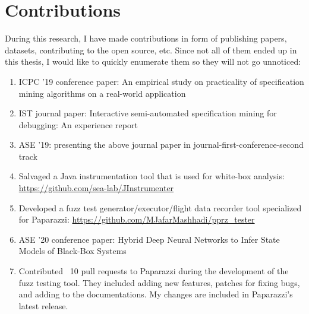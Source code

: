 \dedication{To the ones who made this a smoother journey.} 


\tableofcontents


\listoftables


\listoffigures


\chapter{Contributions}
During this research, I have made contributions in form of publishing papers, datasets, contributing to the open source, etc. 
Since not all of them ended up in this thesis, I would like to quickly enumerate them so they will not go unnoticed:
\begin{enumerate}
    \item ICPC '19 conference paper: An empirical study on practicality of specification mining algorithms on a real-world application \cite{mashhadi2019empirical}
    \item IST journal paper: Interactive semi-automated specification mining for debugging: An experience report \cite{jafar2019interactive}
    \item ASE '19: presenting the above journal paper in journal-first-conference-second track
    \item Salvaged a Java instrumentation tool that is used for white-box analysis: \url{https://github.com/sea-lab/JInstrumenter}
    \item Developed a fuzz test generator/executor/flight data recorder tool specialized for Paparazzi: \url{https://github.com/MJafarMashhadi/pprz_tester}
    \item ASE '20 conference paper: Hybrid Deep Neural Networks to Infer State Models of Black-Box Systems
    \item Contributed ~10 pull requests to Paparazzi during the development of the fuzz testing tool. They included adding new features, patches for fixing bugs, and adding to the documentations. My changes are included in Paparazzi's latest release.
\end{enumerate}
